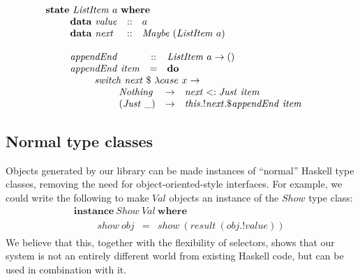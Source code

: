 \begin{displaymath}
\begin{array}{l}
\mathbf{state}~\mathit{ListItem}~a~\mathbf{where} \\
\qquad \begin{array}{lcl}
\mathbf{data}~\mathit{value} & :: & a \\
\mathbf{data}~\mathit{next}  & :: & \mathit{Maybe}~(\mathit{ListItem}~a)
\end{array}\\\\
\qquad \begin{array}{lcl}
\mathit{appendEnd} & :: & \mathit{ListItem}~a \to () \\
\mathit{appendEnd}~\mathit{item} & = & \mathbf{do} \\
 \multicolumn{3}{l}{\qquad \begin{array}{l}
\mathit{switch}~\mathit{next}~\$~\lambda case~x \to \\
\qquad \begin{array}{lcl}
\mathit{Nothing} & \to & \mathit{next} <: \mathit{Just}~\mathit{item} \\
\mathit{(Just~\_)} & \to & \mathit{this}.!\mathit{next}.\$\mathit{appendEnd}~\mathit{item}
\end{array}
\end{array}}
\end{array}
\end{array}
\end{displaymath}

\subsection{Normal type classes}

Objects generated by our library can be made instances of ``normal'' Haskell type classes, removing the need for object-oriented-style interfaces. For example, we could write the following to make $\mathit{Val}$ objects an instance of the $\mathit{Show}$ type class:
\begin{displaymath}
\begin{array}{l}
\mathbf{instance}~\mathit{Show}~\mathit{Val}~\mathbf{where}\\
\qquad \begin{array}{lcl}
\mathit{show}~\mathit{obj} & = & \mathit{show}~(\mathit{result}~(\mathit{obj}.!\mathit{value})) 
\end{array}
\end{array}
\end{displaymath}
We believe that this, together with the flexibility of selectors, shows that our system is not an entirely different world from existing Haskell code, but can be used in combination with it.
